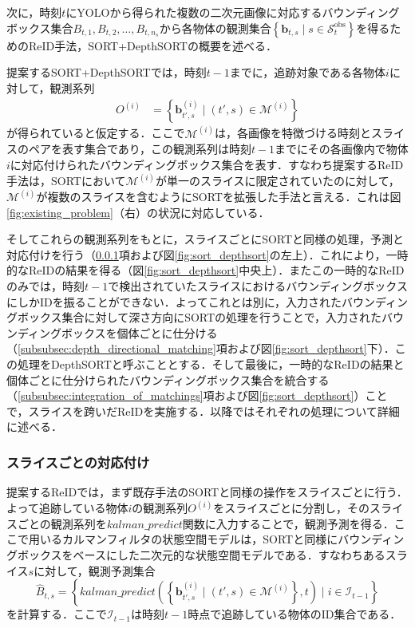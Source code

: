     次に，時刻$t$にYOLOから得られた複数の二次元画像に対応するバウンディングボックス集合$B_{t, 1}, B_{t, 2}, \dots, B_{t, n_s}$から各物体の観測集合$\left\{\bm{b}_{t, s} \mid s \in \mathcal{S}_t^{\text{obs}}\right\}$を得るためのReID手法，SORT+DepthSORTの概要を述べる．

    提案するSORT+DepthSORTでは，時刻$t-1$までに，追跡対象である各物体$i$に対して，観測系列
    \begin{equation}
        \label{eq:tracks_on_reid}
        \begin{aligned}
            O^{(i)} &= \left\{\bm{b}_{t',s}^{(i)} \mid (t', s) \in \mathcal{M}^{(i)}\right\}
        \end{aligned}
    \end{equation}
    が得られていると仮定する．ここで$\mathcal{M}^{(i)}$は，各画像を特徴づける時刻とスライスのペアを表す集合であり，この観測系列は時刻$t-1$までにその各画像内で物体$i$に対応付けられたバウンディングボックス集合を表す．すなわち提案するReID手法は，SORTにおいて$\mathcal{M}^{(i)}$が単一のスライスに限定されていたのに対して，$\mathcal{M}^{(i)}$が複数のスライスを含むようにSORTを拡張した手法と言える．これは図\ref{fig:existing_problem}（右）の状況に対応している．

    そしてこれらの観測系列をもとに，スライスごとにSORTと同様の処理，予測と対応付けを行う（\ref{subsubsec:slice_wise_matching}項および図\ref{fig:sort_depthsort}の左上）．これにより，一時的なReIDの結果を得る（図\ref{fig:sort_depthsort}中央上）．またこの一時的なReIDのみでは，時刻$t-1$で検出されていたスライスにおけるバウンディングボックスにしかIDを振ることができない．よってこれとは別に，入力されたバウンディングボックス集合に対して深さ方向にSORTの処理を行うことで，入力されたバウンディングボックスを個体ごとに仕分ける（\ref{subsubsec:depth_directional_matching}項および図\ref{fig:sort_depthsort}下）．この処理をDepthSORTと呼ぶこととする．そして最後に，一時的なReIDの結果と個体ごとに仕分けられたバウンディングボックス集合を統合する（\ref{subsubsec:integration_of_matchings}項および図\ref{fig:sort_depthsort}）ことで，スライスを跨いだReIDを実施する．以降ではそれぞれの処理について詳細に述べる．

        \subsubsection{スライスごとの対応付け}
        \label{subsubsec:slice_wise_matching}

        提案するReIDでは，まず既存手法のSORTと同様の操作をスライスごとに行う．よって追跡している物体$i$の観測系列$O^{(i)}$をスライスごとに分割し，そのスライスごとの観測系列を$kalman\_predict$関数に入力することで，観測予測を得る．ここで用いるカルマンフィルタの状態空間モデルは，SORTと同様にバウンディングボックスをベースにした二次元的な状態空間モデルである．すなわちあるスライス$s$に対して，観測予測集合
        \begin{equation}
            \label{eq:slice_wise_prediction}
            \hat{B}_{t, s} = \left\{kalman\_predict\left(\left\{\bm{b}_{t', s}^{(i)} \mid (t', s) \in \mathcal{M}^{(i)}\right\}, t\right) \mid i \in \mathcal{I}_{t-1}\right\}
        \end{equation}
        を計算する．ここで$\mathcal{I}_{t-1}$は時刻$t-1$時点で追跡している物体のID集合である．
        
